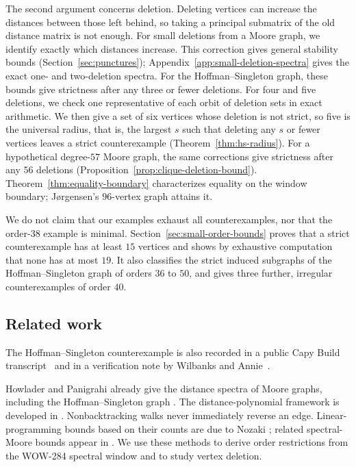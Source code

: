 \documentclass[a4paper,10pt,reqno]{amsart}
\theoremstyle{plain}
\theoremstyle{definition}
\theoremstyle{remark}
\begin{document}
The second argument concerns deletion. Deleting vertices can increase the
distances between those left behind, so taking a principal submatrix of the
old distance matrix is not enough. For small deletions from a Moore graph,
we identify exactly which distances increase. This correction gives general
stability bounds (Section~\ref{sec:punctures});
Appendix~\ref{app:small-deletion-spectra} gives the exact one- and
two-deletion spectra. For the Hoffman--Singleton graph, these bounds give
strictness after any three or fewer deletions. For four and five deletions,
we check one representative of each orbit of deletion sets in exact
arithmetic. We then give a set of six vertices whose deletion is not strict,
so five is the universal radius, that is, the largest \(s\) such that
deleting any \(s\) or fewer vertices leaves a strict counterexample
(Theorem~\ref{thm:hs-radius}).
For a hypothetical degree-\(57\) Moore graph, the same corrections give
strictness after any \(56\) deletions
(Proposition~\ref{prop:clique-deletion-bound}).
Theorem~\ref{thm:equality-boundary} characterizes equality on the window boundary;
J{\o}rgensen's \(96\)-vertex graph attains it.

We do not claim that our examples exhaust all counterexamples, nor that the
order-$38$ example is minimal.
Section~\ref{sec:small-order-bounds} proves that a strict counterexample has at
least \(15\) vertices and shows by exhaustive computation that none has at most
\(19\). It also classifies the strict induced subgraphs of the Hoffman--Singleton
graph of orders \(36\) to \(50\), and gives three further, irregular
counterexamples of order \(40\).

\subsection{Related work}

The Hoffman--Singleton counterexample is also recorded in a public Capy
Build transcript~\cite{CapyBuild2026} and in a verification note by Wilbanks
and Annie~\cite{WilbanksAnnie2026}.

Howlader and Panigrahi already give the distance spectra of Moore graphs,
including the Hoffman--Singleton graph
\cite[Theorem~2.5(1)]{HowladerPanigrahi2022}. The distance-polynomial
framework is developed in \cite{HowladerPanigrahi2022,Fiol2016}.
Nonbacktracking walks never immediately reverse an edge. Linear-programming
bounds based on their counts are due to Nozaki
\cite{Nozaki2015}; related spectral-Moore bounds appear in
\cite{CioabaEtAl2016}. We use these methods to derive order restrictions
from the WOW-284 spectral window and to study vertex deletion.
\end{document}
